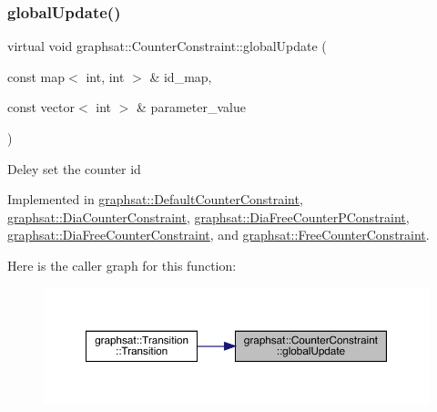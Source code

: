 \subsubsection{\texorpdfstring{globalUpdate()}{globalUpdate()}}
{\footnotesize\ttfamily virtual void graphsat\+::\+Counter\+Constraint\+::global\+Update (\begin{DoxyParamCaption}\item[{const map$<$ int, int $>$ \&}]{id\+\_\+map,  }\item[{const vector$<$ int $>$ \&}]{parameter\+\_\+value }\end{DoxyParamCaption})\hspace{0.3cm}{\ttfamily [pure virtual]}}

Deley set the counter id 

Implemented in \mbox{\hyperlink{classgraphsat_1_1_default_counter_constraint_a5f131f57aa2685073391c372405322dd}{graphsat\+::\+Default\+Counter\+Constraint}}, \mbox{\hyperlink{classgraphsat_1_1_dia_counter_constraint_a75319d3a2b1cf2db7cf540b732729871}{graphsat\+::\+Dia\+Counter\+Constraint}}, \mbox{\hyperlink{classgraphsat_1_1_dia_free_counter_p_constraint_a4a0fe8c88aba82f93aa6b78b0af68cc1}{graphsat\+::\+Dia\+Free\+Counter\+P\+Constraint}}, \mbox{\hyperlink{classgraphsat_1_1_dia_free_counter_constraint_a64d4ec6cb17f6543320bf58ae2b6de01}{graphsat\+::\+Dia\+Free\+Counter\+Constraint}}, and \mbox{\hyperlink{classgraphsat_1_1_free_counter_constraint_adb132f25be53be665c6337224c95f15a}{graphsat\+::\+Free\+Counter\+Constraint}}.

Here is the caller graph for this function\+:
\nopagebreak
\begin{figure}[H]
\begin{center}
\leavevmode
\includegraphics[width=350pt]{classgraphsat_1_1_counter_constraint_aa467ff66b37a1cbc69f5eddb269aaa0d_icgraph}
\end{center}
\end{figure}
\mbox{\label{classgraphsat_1_1_counter_constraint_a1fb82c50097b34656ef5ca319dd352da}} 
